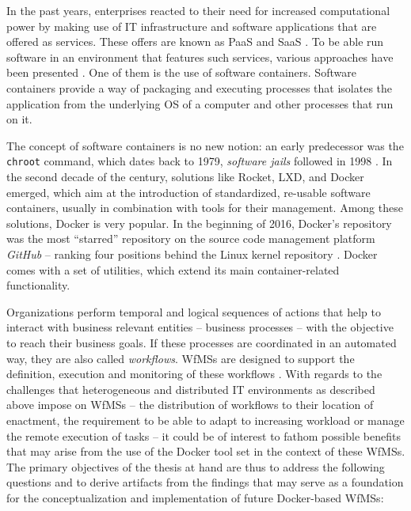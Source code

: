 
In the past years, enterprises reacted to their need for increased computational power by making use of \ac{IT} infrastructure and software applications that are offered as services. These offers are known as \ac{PaaS} and \ac{SaaS} \cite[p.~606]{Buyya2009Cloud}. To be able run software in an environment that features such services, various approaches have been presented \cite[p.~81]{Bernstein2014Containers}. One of them is the use of software containers.
Software containers provide a way of packaging and executing processes that isolates the application from the underlying \ac{OS} of a computer and other processes that run on it.

The concept of software containers is no new notion: an early predecessor was the \texttt{chroot} command, which dates back to 1979, \emph{software jails} followed in 1998 \cite[p.~82]{Bernstein2014Containers}.
In the second decade of the  century, solutions like Rocket, LXD, and Docker emerged, which aim at the introduction of standardized, re-usable software containers, usually in combination with tools for their management. Among these solutions, Docker is very popular. In the beginning of 2016, Docker's repository was the  most ``starred'' repository on the source code management platform \emph{GitHub} -- ranking four positions behind the Linux kernel repository \cite{Github2016Repositories}. Docker comes with a set of utilities, which extend its main container-related functionality.

Organizations perform temporal and logical sequences of actions that help to interact with business relevant entities -- business processes -- with the objective to reach their business goals. If these processes are coordinated in an automated way, they are also called \emph{workflows}. \acp{WfMS} are designed to support the definition, execution and monitoring of these workflows \cite{Becker1999Identifying,Hollingsworth1995Wfmc}.
With regards to the challenges that heterogeneous and distributed \ac{IT} environments as described above impose on \acp{WfMS} -- \eg the distribution of workflows to their location of enactment, the requirement to be able to adapt to increasing workload or manage the remote execution of tasks -- it could be of interest to fathom possible benefits that may arise from the use of the Docker tool set in the context of these \acp{WfMS}. The primary objectives of the thesis at hand are thus to address the following questions and to derive artifacts from the findings that may serve as a foundation for the conceptualization and implementation of future Docker-based \acp{WfMS}:

